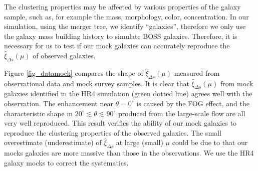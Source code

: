 \documentclass[iop]{emulateapj}
\begin{document}
The clustering properties may be affected by various properties of the galaxy sample, 
such as, for example the mass, morphology, color, concentration. 
In our simulation, using the merger tree, 
we identify ``galaxies'', therefore we only use the galaxy mass building history to simulate BOSS galaxies. 
Therefore, it is necessary for us to test if our mock galaxies can accurately 
reproduce the $\hat\xi_{\Delta s}(\mu)$ of observed galaxies.


Figure \ref{fig_datamock}  compares the shape of $\hat\xi_{\Delta s}(\mu)$ measured from observational data and mock survey samples.
It is clear that $\hat \xi_{\Delta s}(\mu)$ from mock galaxies identified in the HR4 simulation (green dotted line) agrees well with the observation.
The enhancement near $\theta=0^\circ$ is caused by the FOG effect,
and the characteristic shape in $20^\circ\lesssim\theta\lesssim90^\circ$ 
produced from the large-scale flow
are all very well reproduced.
This result verifies the ability of our mock galaxies to reproduce the clustering properties of the observed galaxies.
The small overestimate (underestimate) of $\hat\xi_{\Delta s}$ at large (small) $\mu$ could be due to 
that our mocks galaxies are more massive than those in the observations.
We use the HR4 galaxy mocks to correct the systematics.
\end{document}
